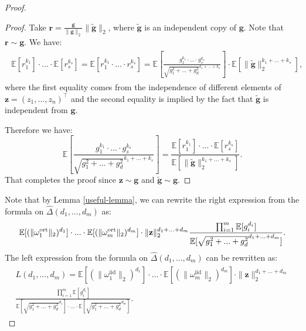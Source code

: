 \begin{proof}
\begin{proof}
Take $\mathbf{r} = \frac{\mathbf{g}}{\|\mathbf{g}\|_{2}}\|\tilde{\mathbf{g}}\|_{2}$, where $\tilde{\mathbf{g}}$ is an independent copy of $\mathbf{g}$. Note that $\mathbf{r} \sim \mathbf{g}$.
We have:
\begin{align}
\begin{split}
\mathbb{E}[r_{1}^{k_{1}}] \cdot ... \cdot     
\mathbb{E}[r_{s}^{k_{s}}] = 
\mathbb{E}[r_{1}^{k_{1}} \cdot ... \cdot r_{s}^{k_{s}}]
= \mathbb{E}[\frac{g_{1}^{k_{1}} \cdot ... \cdot g_{s}^{k_{s}}}{\sqrt{g_{1}^{2}+...+g_{d}^{2}}^{k_{1}+...+k_{s}}}]
\cdot \mathbb{E}[\|\tilde{\mathbf{g}}\|_{2}^{k_{1}+...+k_{s}}],
\end{split}    
\end{align}
where the first equality comes from the independence of different elements of $\mathbf{z}=(z_{1},...,z_{n})^{\top}$
and the second equality is implied by the fact that $\tilde{\mathbf{g}}$ is independent from $\mathbf{g}$.

Therefore we have:
\begin{equation}
 \mathbb{E}[\frac{g_{1}^{k_{1}} \cdot ... \cdot g_{s}^{k_{s}}}{\sqrt{g_{1}^{2}+...+g_{d}^{2}}^{k_{1}+...+k_{s}}}] = \frac{\mathbb{E}[r_{1}^{k_{1}}] \cdot ... \cdot     \mathbb{E}[r_{s}^{k_{s}}]}{\mathbb{E}[\|\tilde{\mathbf{g}}\|_{2}^{k_{1}+...+k_{s}}]}.   
\end{equation}
That completes the proof since $\mathbf{z} \sim \mathbf{g}$ and $\tilde{\mathbf{g}} \sim \mathbf{g}$.
\end{proof}

Note that by Lemma \ref{useful-lemma}, we can rewrite the right expression from the formula on 
$\widehat{\Delta}(d_1,..., d_m)$
as: 
\begin{equation}
\mathbb{E}[(\|\omega_{1}^{\mathrm{ort}}\|_{2})^{d_{1}}] \cdot ... \cdot \mathbb{E}[(\|\omega_{m}^{\mathrm{ort}}\|_{2})^{d_{m}}] \cdot \\
\|\mathbf{z}\|_{2}^{d_{1}+...+d_{m}}\frac{\prod_{i=1}^{m}\mathbb{E}[g_{i}^{d_{i}}]}{\mathbb{E}[\sqrt{g_{1}^{2}+...+g_{d}^{2}}^{d_{1}+...+d_{m}}]}.
\end{equation}
The left expression from the formula on 
$\widehat{\Delta}(d_1,..., d_m)$ can be rewritten as:
\begin{align}
\begin{split}
L(d_{1},...,d_{m}) = \mathbb{E}[(\|\omega_{1}^{\mathrm{iid}}\|_{2})^{d_{1}}] \cdot ... \cdot \mathbb{E}[(\|\omega_{m}^{\mathrm{iid}}\|_{2})^{d_{m}}] \cdot 
\|\mathbf{z}\|_{2}^{d_{1}+...+d_{m}} \\
\frac{\prod_{i=1}^{m}\mathbb{E}[g_{i}^{d_{i}}]}
{\mathbb{E}[\sqrt{g_{1}^{2}+...+g_{d}^{2}}^{d_{1}}] \cdot ...\cdot \mathbb{E}[\sqrt{g_{1}^{2}+...+g_{d}^{2}}^{d_{m}}]}.
\end{split}
\end{align}


\end{proof}
